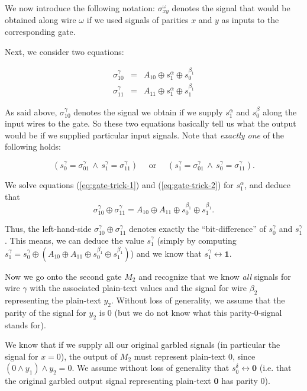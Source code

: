 We now introduce the following notation: $\sigma_{xy}^\omega$ denotes the signal that would be obtained along wire $\omega$ if we used signals of parities $x$ and $y$ as inputs to the corresponding gate.

Next, we consider two equations:

\begin{eqnarray}
\label{eq:gate-trick-1}
\sigma_{10}^\gamma &=& A_{10} \oplus s_1^\alpha \oplus s_0^{\beta_1} \\
\label{eq:gate-trick-2}
\sigma_{11}^\gamma &=& A_{11} \oplus s_1^\alpha \oplus s_1^{\beta_1}
\end{eqnarray}

As said above, $\sigma_{10}^\gamma$ denotes the signal we obtain if we supply $s_1^\alpha$ and $s_0^\beta$ along the input wires to the gate. So these two equations basically tell us what the output would be if we supplied particular input signals. Note that \emph{exactly one} of the following holds: 

\begin{equation*}
  (s_0^\gamma = \sigma_{01}^\gamma \, \wedge \, s_1^\gamma = \sigma_{11}^\gamma) \quad \text{ or } \quad (s_1^\gamma = \sigma_{01}^\gamma \, \wedge \, s_0^\gamma = \sigma_{11}^\gamma).
\end{equation*}

We solve equations (\ref{eq:gate-trick-1}) and (\ref{eq:gate-trick-2}) for $s_1^\alpha$, and deduce that
\begin{equation*}
  \sigma_{10}^\gamma\oplus\sigma_{11}^\gamma = A_{10}\oplus A_{11} \oplus s_0^{\beta_1} \oplus s_1^{\beta_1}.
\end{equation*}

Thus, the left-hand-side $\sigma_{10}^\gamma\oplus\sigma_{11}^\gamma$ denotes exactly the ``bit-difference'' of $s_0^\gamma$ and $s_1^\gamma$. This means, we can deduce the value $s_1^\gamma$ (simply by computing $s_1^\gamma = s_0^\gamma \oplus (A_{10}\oplus A_{11} \oplus s_0^{\beta_1} \oplus s_1^{\beta_1})$) and we know that $s_1^\gamma\leftrightarrow \mathbf{1}$.

Now we go onto the second gate $M_2$ and recognize that we know \emph{all} signals for wire $\gamma$ with the associated plain-text values and the signal for wire $\beta_2$ representing the plain-text $y_2$. Without loss of generality, we assume that the parity of the signal for $y_2$ is $0$ (but we do not know what this parity-0-signal stands for).

We know that if we supply all our original garbled signals (in particular the signal for $x=0$), the output of $M_2$ must represent plain-text 0, since $(0\wedge y_1)\wedge y_2=0$. We assume without loss of generality that $s_0^\delta \leftrightarrow \mathbf{0}$ (i.e. that the original garbled output signal representing plain-text $\mathbf{0}$ has parity 0).

